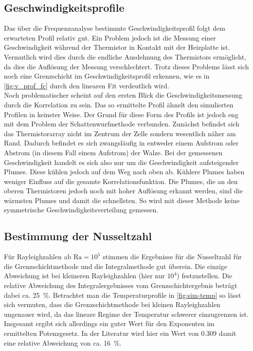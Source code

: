 \subsection{Geschwindigkeitsprofile}
Das über die Frequenzanalyse bestimmte Geschwindigkeitsprofil folgt dem erwarteten Profil relativ gut. Ein Problem jedoch ist die Messung einer Geschwindigkeit während der Thermistor in Kontakt mit der Heizplatte ist. Vermutlich wird dies durch die endliche Ausdehnung des Thermistors ermöglicht, da dies die Auflösung der Messung verschlechtert.
Trotz dieses Problems lässt sich noch eine Grenzschicht im Geschwindigkeitsprofil erkennen, wie es in \cref{fig:v_prof_fc} durch den linearen Fit verdeutlich wird.
\\
Noch problematischer scheint auf den ersten Blick die Geschwindigkeitsmessung durch die Korrelation zu sein.
Das so ermittelte Profil ähnelt den simulierten Profilen in keinster Weise. Der Grund für diese Form des Profils ist jedoch eng mit dem Problem der Schattenwurfmethode verbunden.
Zunächst befindet sich das Thermistorarray nicht im Zentrum der Zelle sondern wesentlich näher am Rand. 
Dadurch befindet es sich zwangsläufig in entweder einem Aufstrom oder Abstrom (in diesem Fall einem Aufstrom) der Walze.
Bei der gemessenen Geschwindigkeit handelt es sich also nur um die Geschwindigkeit aufsteigender Plumes.
Diese kühlen jedoch auf dem Weg nach oben ab. 
Kühlere Plumes haben weniger Einfluss auf die gesamte Korrelationsfunktion. 
Die Plumes, die an den oberen Thermistoren jedoch noch mit hoher Auflösung erkannt werden, sind die wärmsten Plumes und damit die schnellsten.
So wird mit dieser Methode keine symmetrische Geschwindigkeitsverteilung gemessen.
\newpage
\subsection{Bestimmung der Nusseltzahl}
Für Rayleighzahlen ab $\text{Ra} = 10^5$ stimmen die Ergebnisse für die Nusseltzahl für die Grenzschichtmethode und die Integralmethode gut überein. Die einzige Abweichung ist bei kleineren Rayleighzahlen (hier nur $10^4$) festzustellen. Die relative Abweichung des Integralergebnisses vom Grenzschichtergebnis beträgt dabei ca. 25~\%.
Betrachtet man die Temperaturprofile in \cref{fig:sim-temp} so lässt sich vermuten, dass die Grenzschichtmethode bei kleinen Rayleighzahlen ungenauer wird, da das lineare Regime der Temperatur schwerer einzugrenzen ist.
\\
Insgesamt ergibt sich allerdings ein guter Wert für den Exponenten im ermittelten Potenzgesetz. In der Literatur wird hier ein Wert von $0.309$ \cite{expo} damit eine relative Abweichung von ca. 16~\%. 





